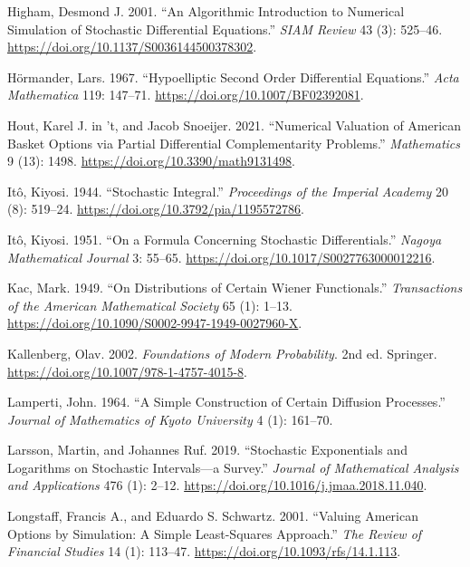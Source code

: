 \documentclass[
  english,
  10pt,
  letterpaper,
  DIV=11,
  numbers=noendperiod]{scrartcl}
\newlength{\cslhangindent}
\newenvironment{CSLReferences}[2] %
 {\begin{list}{}{%
  \setlength{\itemindent}{0pt}
  \setlength{\leftmargin}{0pt}
  \setlength{\parsep}{0pt}
  \ifodd #1
   \setlength{\leftmargin}{\cslhangindent}
   \setlength{\itemindent}{-1\cslhangindent}
  \fi
  \setlength{\itemsep}{#2\baselineskip}}}
 {\end{list}}
\theoremstyle{definition}
\theoremstyle{plain}
\theoremstyle{plain}
\theoremstyle{remark}
\begin{document}
\begin{CSLReferences}{1}{1}
Higham, Desmond J. 2001. {``An Algorithmic Introduction to Numerical
Simulation of Stochastic Differential Equations.''} \emph{SIAM Review}
43 (3): 525--46. \url{https://doi.org/10.1137/S0036144500378302}.

Hörmander, Lars. 1967. {``Hypoelliptic Second Order Differential
Equations.''} \emph{Acta Mathematica} 119: 147--71.
\url{https://doi.org/10.1007/BF02392081}.

Hout, Karel J. in 't, and Jacob Snoeijer. 2021. {``Numerical Valuation
of American Basket Options via Partial Differential Complementarity
Problems.''} \emph{Mathematics} 9 (13): 1498.
\url{https://doi.org/10.3390/math9131498}.

Itô, Kiyosi. 1944. {``Stochastic Integral.''} \emph{Proceedings of the
Imperial Academy} 20 (8): 519--24.
\url{https://doi.org/10.3792/pia/1195572786}.

Itô, Kiyosi. 1951. {``On a Formula Concerning Stochastic
Differentials.''} \emph{Nagoya Mathematical Journal} 3: 55--65.
\url{https://doi.org/10.1017/S0027763000012216}.

Kac, Mark. 1949. {``On Distributions of Certain Wiener Functionals.''}
\emph{Transactions of the American Mathematical Society} 65 (1): 1--13.
\url{https://doi.org/10.1090/S0002-9947-1949-0027960-X}.

Kallenberg, Olav. 2002. \emph{Foundations of Modern Probability}. 2nd
ed. Springer. \url{https://doi.org/10.1007/978-1-4757-4015-8}.

Lamperti, John. 1964. {``A Simple Construction of Certain Diffusion
Processes.''} \emph{Journal of Mathematics of Kyoto University} 4 (1):
161--70.

Larsson, Martin, and Johannes Ruf. 2019. {``Stochastic Exponentials and
Logarithms on Stochastic Intervals---a Survey.''} \emph{Journal of
Mathematical Analysis and Applications} 476 (1): 2--12.
\url{https://doi.org/10.1016/j.jmaa.2018.11.040}.

Longstaff, Francis A., and Eduardo S. Schwartz. 2001. {``Valuing
American Options by Simulation: A Simple Least-Squares Approach.''}
\emph{The Review of Financial Studies} 14 (1): 113--47.
\url{https://doi.org/10.1093/rfs/14.1.113}.


\end{CSLReferences}
\end{document}
